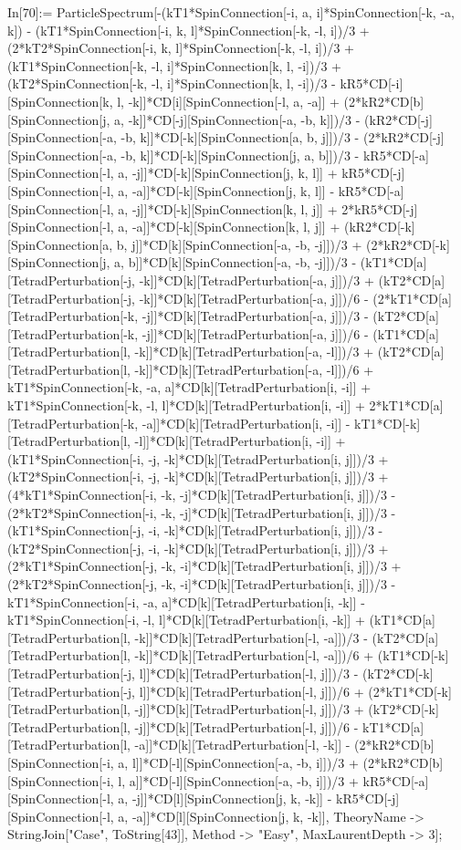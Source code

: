 In[70]:= ParticleSpectrum[-(kT1*SpinConnection[-i, a, i]*SpinConnection[-k, -a, k]) - (kT1*SpinConnection[-i, k, l]*SpinConnection[-k, -l, i])/3 + (2*kT2*SpinConnection[-i, k, l]*SpinConnection[-k, -l, i])/3 + (kT1*SpinConnection[-k, -l, i]*SpinConnection[k, l, -i])/3 + (kT2*SpinConnection[-k, -l, i]*SpinConnection[k, l, -i])/3 - kR5*CD[-i][SpinConnection[k, l, -k]]*CD[i][SpinConnection[-l, a, -a]] + (2*kR2*CD[b][SpinConnection[j, a, -k]]*CD[-j][SpinConnection[-a, -b, k]])/3 - (kR2*CD[-j][SpinConnection[-a, -b, k]]*CD[-k][SpinConnection[a, b, j]])/3 - (2*kR2*CD[-j][SpinConnection[-a, -b, k]]*CD[-k][SpinConnection[j, a, b]])/3 - kR5*CD[-a][SpinConnection[-l, a, -j]]*CD[-k][SpinConnection[j, k, l]] + kR5*CD[-j][SpinConnection[-l, a, -a]]*CD[-k][SpinConnection[j, k, l]] - kR5*CD[-a][SpinConnection[-l, a, -j]]*CD[-k][SpinConnection[k, l, j]] + 2*kR5*CD[-j][SpinConnection[-l, a, -a]]*CD[-k][SpinConnection[k, l, j]] + (kR2*CD[-k][SpinConnection[a, b, j]]*CD[k][SpinConnection[-a, -b, -j]])/3 + (2*kR2*CD[-k][SpinConnection[j, a, b]]*CD[k][SpinConnection[-a, -b, -j]])/3 - (kT1*CD[a][TetradPerturbation[-j, -k]]*CD[k][TetradPerturbation[-a, j]])/3 + (kT2*CD[a][TetradPerturbation[-j, -k]]*CD[k][TetradPerturbation[-a, j]])/6 - (2*kT1*CD[a][TetradPerturbation[-k, -j]]*CD[k][TetradPerturbation[-a, j]])/3 - (kT2*CD[a][TetradPerturbation[-k, -j]]*CD[k][TetradPerturbation[-a, j]])/6 - (kT1*CD[a][TetradPerturbation[l, -k]]*CD[k][TetradPerturbation[-a, -l]])/3 + (kT2*CD[a][TetradPerturbation[l, -k]]*CD[k][TetradPerturbation[-a, -l]])/6 + kT1*SpinConnection[-k, -a, a]*CD[k][TetradPerturbation[i, -i]] + kT1*SpinConnection[-k, -l, l]*CD[k][TetradPerturbation[i, -i]] + 2*kT1*CD[a][TetradPerturbation[-k, -a]]*CD[k][TetradPerturbation[i, -i]] - kT1*CD[-k][TetradPerturbation[l, -l]]*CD[k][TetradPerturbation[i, -i]] + (kT1*SpinConnection[-i, -j, -k]*CD[k][TetradPerturbation[i, j]])/3 + (kT2*SpinConnection[-i, -j, -k]*CD[k][TetradPerturbation[i, j]])/3 + (4*kT1*SpinConnection[-i, -k, -j]*CD[k][TetradPerturbation[i, j]])/3 - (2*kT2*SpinConnection[-i, -k, -j]*CD[k][TetradPerturbation[i, j]])/3 - (kT1*SpinConnection[-j, -i, -k]*CD[k][TetradPerturbation[i, j]])/3 - (kT2*SpinConnection[-j, -i, -k]*CD[k][TetradPerturbation[i, j]])/3 + (2*kT1*SpinConnection[-j, -k, -i]*CD[k][TetradPerturbation[i, j]])/3 + (2*kT2*SpinConnection[-j, -k, -i]*CD[k][TetradPerturbation[i, j]])/3 - kT1*SpinConnection[-i, -a, a]*CD[k][TetradPerturbation[i, -k]] - kT1*SpinConnection[-i, -l, l]*CD[k][TetradPerturbation[i, -k]] + (kT1*CD[a][TetradPerturbation[l, -k]]*CD[k][TetradPerturbation[-l, -a]])/3 - (kT2*CD[a][TetradPerturbation[l, -k]]*CD[k][TetradPerturbation[-l, -a]])/6 + (kT1*CD[-k][TetradPerturbation[-j, l]]*CD[k][TetradPerturbation[-l, j]])/3 - (kT2*CD[-k][TetradPerturbation[-j, l]]*CD[k][TetradPerturbation[-l, j]])/6 + (2*kT1*CD[-k][TetradPerturbation[l, -j]]*CD[k][TetradPerturbation[-l, j]])/3 + (kT2*CD[-k][TetradPerturbation[l, -j]]*CD[k][TetradPerturbation[-l, j]])/6 - kT1*CD[a][TetradPerturbation[l, -a]]*CD[k][TetradPerturbation[-l, -k]] - (2*kR2*CD[b][SpinConnection[-i, a, l]]*CD[-l][SpinConnection[-a, -b, i]])/3 + (2*kR2*CD[b][SpinConnection[-i, l, a]]*CD[-l][SpinConnection[-a, -b, i]])/3 + kR5*CD[-a][SpinConnection[-l, a, -j]]*CD[l][SpinConnection[j, k, -k]] - kR5*CD[-j][SpinConnection[-l, a, -a]]*CD[l][SpinConnection[j, k, -k]], TheoryName -> StringJoin["Case", ToString[43]], Method -> "Easy", MaxLaurentDepth -> 3]; 